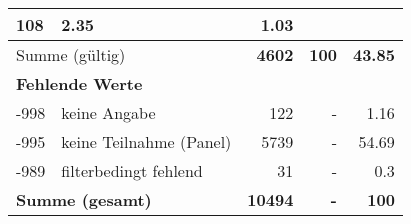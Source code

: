 \begin{longtable}{lXrrr}
       \num{108} &
       \num[round-mode=places,round-precision=2]{2,35} &
         \num[round-mode=places,round-precision=2]{1,03} \\
     \midrule
     \multicolumn{2}{l}{Summe (gültig)} &
       \textbf{\num{4602}} &
     \textbf{100} &
       \textbf{\num[round-mode=places,round-precision=2]{43,85}} \\
     \multicolumn{5}{l}{\textbf{Fehlende Werte}}\\
       -998 &
       keine Angabe &
         \num{122} &
        - &
         \num[round-mode=places,round-precision=2]{1,16} \\
       -995 &
       keine Teilnahme (Panel) &
         \num{5739} &
        - &
         \num[round-mode=places,round-precision=2]{54,69} \\
       -989 &
       filterbedingt fehlend &
         \num{31} &
        - &
         \num[round-mode=places,round-precision=2]{0,3} \\
     \midrule
     \multicolumn{2}{l}{\textbf{Summe (gesamt)}} &
          \textbf{\num{10494}} &
        \textbf{-} &
        \textbf{100} \\
     \bottomrule
     \end{longtable}
     

